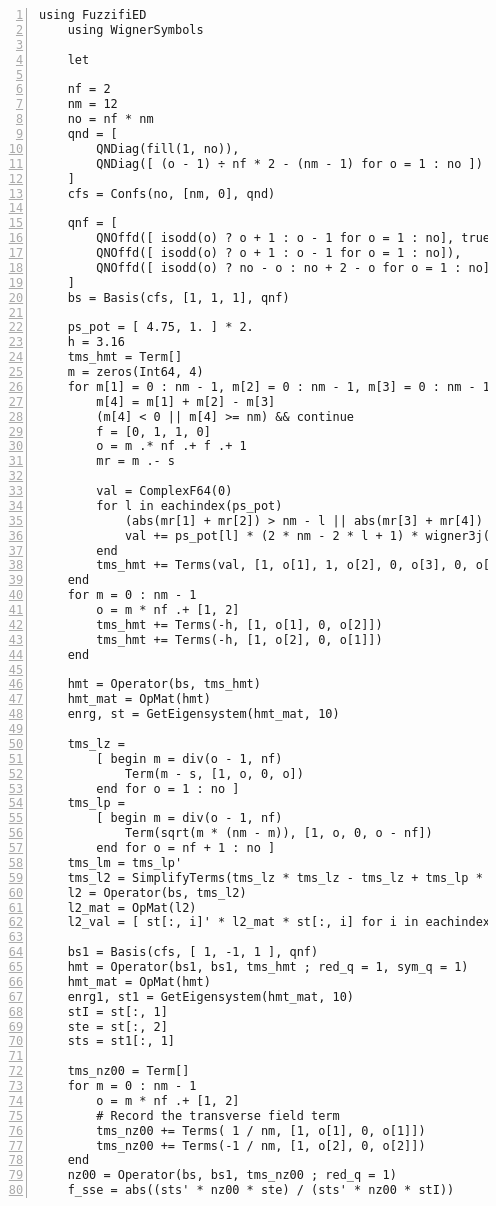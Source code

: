 \documentclass{timesjhep}
\begin{document}
\begin{lstlisting}[numbers=left]
    using FuzzifiED
    using WignerSymbols

    let

    nf = 2
    nm = 12
    no = nf * nm
    qnd = [ 
        QNDiag(fill(1, no)), 
        QNDiag([ (o - 1) ÷ nf * 2 - (nm - 1) for o = 1 : no ])
    ]
    cfs = Confs(no, [nm, 0], qnd)

    qnf = [ 
        QNOffd([ isodd(o) ? o + 1 : o - 1 for o = 1 : no], true, ComplexF64[ isodd(o) ? -1 : 1 for o = 1 : no]),
        QNOffd([ isodd(o) ? o + 1 : o - 1 for o = 1 : no]),
        QNOffd([ isodd(o) ? no - o : no + 2 - o for o = 1 : no], ComplexF64(-1) .^ (collect(0 : nm * nf - 1) .÷ nf))
    ]
    bs = Basis(cfs, [1, 1, 1], qnf) 

    ps_pot = [ 4.75, 1. ] * 2.
    h = 3.16
    tms_hmt = Term[]
    m = zeros(Int64, 4)
    for m[1] = 0 : nm - 1, m[2] = 0 : nm - 1, m[3] = 0 : nm - 1
        m[4] = m[1] + m[2] - m[3]
        (m[4] < 0 || m[4] >= nm) && continue
        f = [0, 1, 1, 0]
        o = m .* nf .+ f .+ 1
        mr = m .- s
        
        val = ComplexF64(0)
        for l in eachindex(ps_pot)
            (abs(mr[1] + mr[2]) > nm - l || abs(mr[3] + mr[4]) > nm - l) && break 
            val += ps_pot[l] * (2 * nm - 2 * l + 1) * wigner3j(s, s, nm - l, mr[1], mr[2], -mr[1] - mr[2]) * wigner3j(s, s, nm - l, mr[4], mr[3], -mr[3] - mr[4])
        end 
        tms_hmt += Terms(val, [1, o[1], 1, o[2], 0, o[3], 0, o[4]])    
    end 
    for m = 0 : nm - 1
        o = m * nf .+ [1, 2]
        tms_hmt += Terms(-h, [1, o[1], 0, o[2]])
        tms_hmt += Terms(-h, [1, o[2], 0, o[1]])
    end

    hmt = Operator(bs, tms_hmt)
    hmt_mat = OpMat(hmt)
    enrg, st = GetEigensystem(hmt_mat, 10)

    tms_lz = 
        [ begin m = div(o - 1, nf)
            Term(m - s, [1, o, 0, o])
        end for o = 1 : no ]
    tms_lp = 
        [ begin m = div(o - 1, nf)
            Term(sqrt(m * (nm - m)), [1, o, 0, o - nf])
        end for o = nf + 1 : no ]
    tms_lm = tms_lp' 
    tms_l2 = SimplifyTerms(tms_lz * tms_lz - tms_lz + tms_lp * tms_lm)
    l2 = Operator(bs, tms_l2)
    l2_mat = OpMat(l2)
    l2_val = [ st[:, i]' * l2_mat * st[:, i] for i in eachindex(enrg)]

    bs1 = Basis(cfs, [ 1, -1, 1 ], qnf) 
    hmt = Operator(bs1, bs1, tms_hmt ; red_q = 1, sym_q = 1) 
    hmt_mat = OpMat(hmt)
    enrg1, st1 = GetEigensystem(hmt_mat, 10)
    stI = st[:, 1] 
    ste = st[:, 2] 
    sts = st1[:, 1]

    tms_nz00 = Term[]
    for m = 0 : nm - 1
        o = m * nf .+ [1, 2]
        # Record the transverse field term
        tms_nz00 += Terms( 1 / nm, [1, o[1], 0, o[1]])
        tms_nz00 += Terms(-1 / nm, [1, o[2], 0, o[2]])
    end
    nz00 = Operator(bs, bs1, tms_nz00 ; red_q = 1)
    f_sse = abs((sts' * nz00 * ste) / (sts' * nz00 * stI))
\end{lstlisting}
\end{document}
